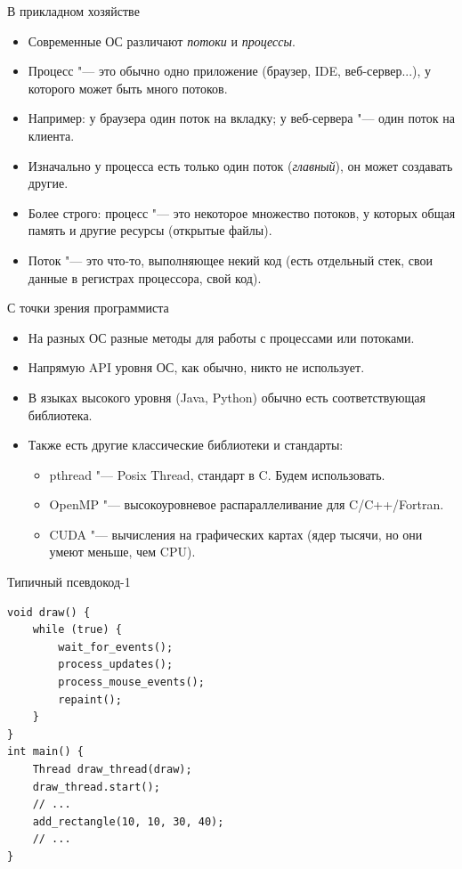 \begin{frame}{В прикладном хозяйстве}
	\begin{itemize}
		\item Современные ОС различают \textit{потоки} и \textit{процессы}.
		\item Процесс "--- это обычно одно приложение (браузер, IDE, веб-сервер...), у которого может быть много потоков.
		\item Например: у браузера один поток на вкладку; у веб-сервера "--- один поток на клиента.
		\item Изначально у процесса есть только один поток (\textit{главный}), он может создавать другие.
		\item Более строго: процесс "--- это некоторое множество потоков, у которых общая память и другие ресурсы (открытые файлы).
		\item Поток "--- это что-то, выполняющее некий код (есть отдельный стек, свои данные в регистрах процессора, свой код).\
	\end{itemize}
\end{frame}

\begin{frame}{С точки зрения программиста}
	\begin{itemize}
		\item На разных ОС разные методы для работы с процессами или потоками.
		\item Напрямую API уровня ОС, как обычно, никто не использует.
		\item В языках высокого уровня (Java, Python) обычно есть соответствующая библиотека.
		\item Также есть другие классические библиотеки и стандарты:
			\begin{itemize}
				\item pthread "--- Posix Thread, стандарт в C. Будем использовать.
				\item OpenMP "--- высокоуровневое распараллеливание для C/C++/Fortran.
				\item CUDA "--- вычисления на графических картах (ядер тысячи, но они умеют меньше, чем CPU).
			\end{itemize}
	\end{itemize}
\end{frame}

\begin{frame}[fragile]{Типичный псевдокод-1}
\begin{verbatim}
void draw() {
    while (true) {
        wait_for_events();
        process_updates();
        process_mouse_events();
        repaint();
    }
}
int main() {
    Thread draw_thread(draw);
    draw_thread.start();
    // ...
    add_rectangle(10, 10, 30, 40);
    // ...
}
\end{verbatim}
\end{frame}

